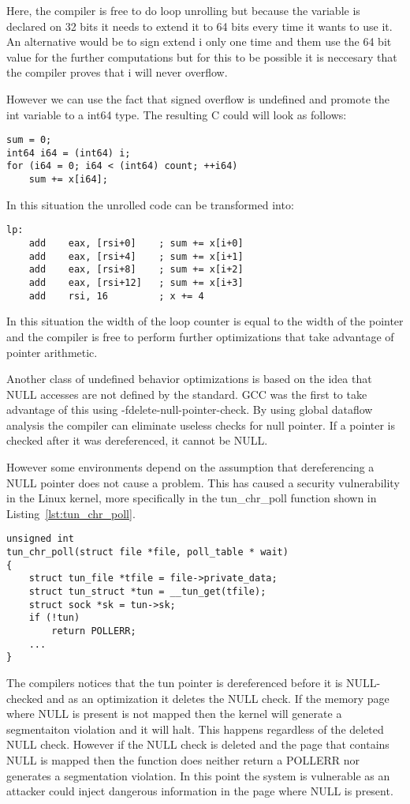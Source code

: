 Here, the compiler is free to do loop unrolling but because the variable
is declared on 32 bits it needs to extend it to 64 bits every time it
wants to use it. An alternative would be to sign extend i only one time
and them use the 64 bit value for the further computations but for this
to be possible it is neccesary that the compiler proves that i will
never overflow.

However we can use the fact that signed overflow is undefined and
promote the int variable to a int64 type. The resulting C could will
look as follows:
\begin{lstlisting}[style=Cstyle, caption={}, label={}]
sum = 0;
int64 i64 = (int64) i;
for (i64 = 0; i64 < (int64) count; ++i64)
	sum += x[i64];
\end{lstlisting}

In this situation the unrolled code can be transformed into:
\begin{lstlisting}[style=Cstyle, caption={}, label={}]
  lp:
    add    eax, [rsi+0]    ; sum += x[i+0]
    add    eax, [rsi+4]    ; sum += x[i+1]
    add    eax, [rsi+8]    ; sum += x[i+2]
    add    eax, [rsi+12]   ; sum += x[i+3]
    add    rsi, 16         ; x += 4
\end{lstlisting}

In this situation the width of the loop counter is equal to the width of
the pointer and the compiler is free to perform further optimizations
that take advantage of pointer arithmetic.

Another class of undefined behavior optimizations is based on the idea
that NULL accesses are not defined by the standard. GCC was the first to
take advantage of this using -fdelete-null-pointer-check. By using
global dataflow analysis the compiler can eliminate useless checks for
null pointer. If a pointer is checked after it was dereferenced, it
cannot be NULL.

However some environments depend on the assumption that dereferencing a
NULL pointer does not cause a problem. This has caused a security
vulnerability in the Linux kernel, more specifically in the tun_chr_poll
function shown in Listing~\ref{lst:tun_chr_poll}.
\begin{lstlisting}[style=Cstyle, caption={tun_chr_poll in
drivers/net/tun.c of the Linux kernel}, label={lst:tun_chr_poll}]
unsigned int
tun_chr_poll(struct file *file, poll_table * wait)
{
	struct tun_file *tfile = file->private_data;
	struct tun_struct *tun = __tun_get(tfile);
	struct sock *sk = tun->sk;
	if (!tun)
		return POLLERR;
	...
}
\end{lstlisting}

The compilers notices that the tun pointer is dereferenced before it is
NULL-checked and as an optimization it deletes the NULL check. If the
memory page where NULL is present is not mapped then the kernel will
generate a segmentaiton violation and it will halt. This happens
regardless of the deleted NULL check. However if the NULL check is
deleted and the page that contains NULL is mapped then the function does
neither return a POLLERR nor generates a segmentation violation. In this
point the system is vulnerable as an attacker could inject dangerous
information in the page where NULL is present.
